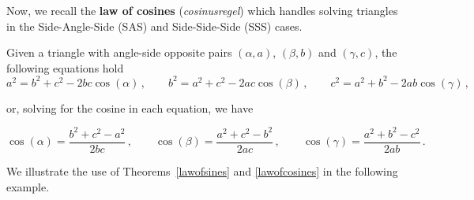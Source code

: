 Now, we recall the \textbf{law of cosines} (\textit{cosinusregel}) which handles solving triangles in the  Side-Angle-Side (SAS) and Side-Side-Side (SSS) cases.
 

\begin{theorem} \label{lawofcosines}    
Given a triangle with angle-side opposite pairs $(\alpha, a)$, $(\beta, b)$ and $(\gamma, c)$, the following equations hold
\[ a^2 = b^2 + c^2 - 2bc \cos(\alpha)\,, \qquad  b^2 = a^2 + c^2 - 2ac \cos(\beta)\,,  \qquad   c^2 = a^2 + b^2 - 2ab \cos(\gamma)\,,  \]

or, solving for the cosine in each equation, we have
 
\[ \cos(\alpha) = \dfrac{b^2+c^2 - a^2}{2bc}\,, \qquad \cos(\beta) = \dfrac{a^2+c^2 - b^2}{2ac}\,, \qquad \cos(\gamma) = \dfrac{a^2+b^2 - c^2}{2ab}\,. \]

\end{theorem}


We illustrate the use of Theorems~\ref{lawofsines} and \ref{lawofcosines} in the following example.

